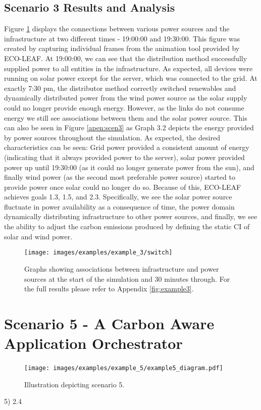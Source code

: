 \documentclass{l4proj}
\begin{document}
\subsection{Scenario 3 Results and Analysis}
Figure \ref{fig:example2_switch} displays the connections between various power sources and the infrastructure at two different times - 19:00:00 and 19:30:00.
This figure was created by capturing individual frames from the animation tool provided by ECO-LEAF.
At 19:00:00, we can see that the distribution method successfully supplied power to all entities in the infrastructure.
As expected, all devices were running on solar power except for the server, which was connected to the grid.
At exactly 7:30 pm, the distributor method correctly switched renewables and dynamically distributed power from the wind power source as the solar supply could no longer provide enough energy.
However, as the links do not consume energy we still see associations between them and the solar power source.
This can also be seen in Figure \ref{apen:scen3} as Graph 3.2 depicts the energy provided by power sources throughout the simulation.
As expected, the desired characteristics can be seen: Grid power provided a consistent amount of energy (indicating that it always provided power to the server), solar power provided power up until 19:30:00 (as it could no longer generate power from the sun), and finally wind power (as the second most preferable power source) started to provide power once solar could no longer do so.
Because of this, ECO-LEAF achieves goals 1.3, 1.5, and 2.3.
Specifically, we see the solar power source fluctuate in power availability as a consequence of time, the power domain dynamically distributing infrastructure to other power sources, and finally, we see the ability to adjust the carbon emissions produced by defining the static CI of solar and wind power.
\begin{figure}
    \centering
    \texttt{[image: images/examples/example\_3/switch]}
    \caption{Graphs showing associations between infrastructure and power sources at the start of the simulation and 30 minutes through. For the full results please refer to Appendix \ref{fig:example3}.}
    \label{fig:example2_switch}
\end{figure}

\section{Scenario 5 - A Carbon Aware Application Orchestrator}\label{eval:subsec:scenario 5}
\begin{figure}[h]
    \centering
    \texttt{[image: images/examples/example\_5/example5\_diagram.pdf]}
    ~
    \caption{Illustration depicting scenario 5.}
    \label{fig:example5_diagram}
\end{figure}
5)	2.4
\end{document}
